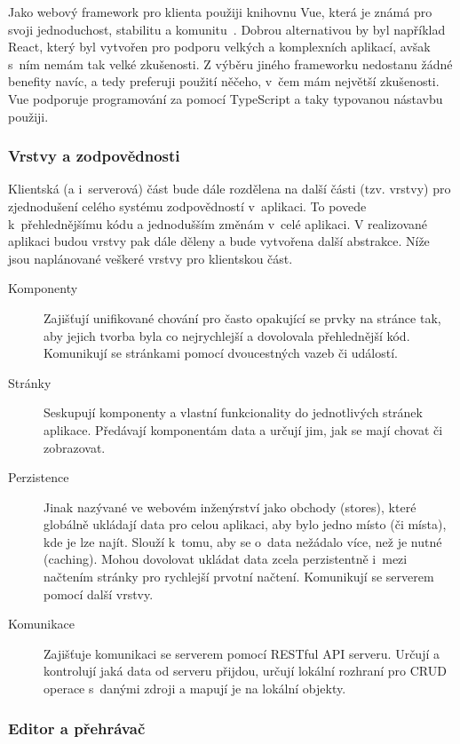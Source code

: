 Jako webový framework pro klienta použiji knihovnu Vue, která je známá pro svoji jednoduchost, stabilitu a komunitu~\cite{potter_2023}.
Dobrou alternativou by byl například React, který byl vytvořen pro podporu velkých a komplexních aplikací, avšak s~ním nemám tak velké zkušenosti.
Z výběru jiného frameworku nedostanu žádné benefity navíc, a tedy preferuji použití něčeho, v~čem mám největší zkušenosti.
Vue podporuje programování za pomocí TypeScript a taky typovanou nástavbu použiji.

\subsubsection{Vrstvy a zodpovědnosti}

Klientská (a i~serverová) část bude dále rozdělena na další části (tzv. vrstvy) pro zjednodušení celého systému zodpovědností v~aplikaci.
To povede k~přehlednějšímu kódu a jednodušším změnám v~celé aplikaci.
V realizované aplikaci budou vrstvy pak dále děleny a bude vytvořena další abstrakce.
Níže jsou naplánované veškeré vrstvy pro klientskou část.

\begin{description}
    \item[Komponenty] Zajišťují unifikované chování pro často opakující se prvky na stránce tak, aby jejich tvorba byla co nejrychlejší a dovolovala přehlednější kód. Komunikují se stránkami pomocí dvoucestných vazeb či událostí.
    \item[Stránky] Seskupují komponenty a vlastní funkcionality do jednotlivých stránek aplikace. Předávají komponentám data a určují jim, jak se mají chovat či zobrazovat.
    \item[Perzistence] Jinak nazývané ve webovém inženýrství jako obchody (stores), které globálně ukládají data pro celou aplikaci, aby bylo jedno místo (či místa), kde je lze najít. Slouží k~tomu, aby se o~data nežádalo více, než je nutné (caching). Mohou dovolovat ukládat data zcela perzistentně i~mezi načtením stránky pro rychlejší prvotní načtení. Komunikují se serverem pomocí další vrstvy.
    \item[Komunikace] Zajišťuje komunikaci se serverem pomocí RESTful API serveru. Určují a kontrolují jaká data od serveru přijdou, určují lokální rozhraní pro CRUD operace s~danými zdroji a mapují je na lokální objekty.
\end{description}

\subsubsection{Editor a přehrávač}

